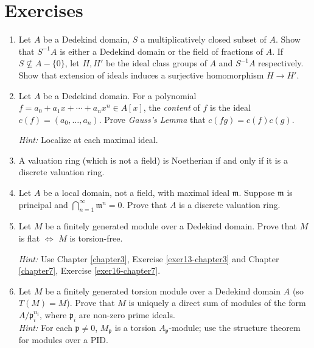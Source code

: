 \section*{Exercises}

\begin{enumerate}
    \item \label{exer1-chapter9}Let $A$ be a Dedekind domain, $S$ a multiplicatively closed subset of $A$. Show that $S^{-1}A$ is either a Dedekind domain or the field of fractions of $A$. If $S \not\subseteq A - \{0\}$, let $H, H'$ be the ideal class groups of $A$ and $S^{-1}A$ respectively. Show that extension of ideals induces a surjective homomorphism $H \to H'$.

    \item \label{exer2-chapter9}Let $A$ be a Dedekind domain. For a polynomial $f = a_0 + a_1 x + \cdots + a_n x^n \in A[x]$, the \emph{content} of $f$ is the ideal $c(f) = (a_0, \ldots, a_n)$. Prove \emph{Gauss's Lemma} that $c(fg) = c(f)c(g)$.
    
    \textit{Hint:} Localize at each maximal ideal.

    \item \label{exer3-chapter9}A valuation ring (which is not a field) is Noetherian if and only if it is a discrete valuation ring.

    \item \label{exer4-chapter9}Let $A$ be a local domain, not a field, with maximal ideal $\mathfrak{m}$. Suppose $\mathfrak{m}$ is principal and $\bigcap_{n=1}^\infty \mathfrak{m}^n = 0$. Prove that $A$ is a discrete valuation ring.

    \item \label{exer5-chapter9}Let $M$ be a finitely generated module over a Dedekind domain. Prove that $M$ is flat $\iff$ $M$ is torsion-free.
    
    \textit{Hint:} Use Chapter \ref{chapter3}, Exercise \ref{exer13-chapter3} and Chapter \ref{chapter7}, Exercise \ref{exer16-chapter7}.

    \item \label{exer6-chapter9}Let $M$ be a finitely generated torsion module over a Dedekind domain $A$ (so $T(M) = M$). Prove that $M$ is uniquely a direct sum of modules of the form $A/\mathfrak{p}_i^{n_i}$, where $\mathfrak{p}_i$ are non-zero prime ideals.\\
    \textit{Hint:} For each $\mathfrak{p} \neq 0$, $M_\mathfrak{p}$ is a torsion $A_\mathfrak{p}$-module; use the structure theorem for modules over a PID.


\end{enumerate}
